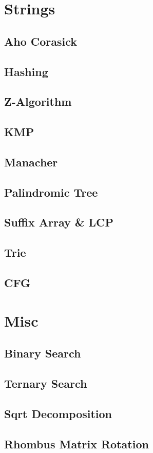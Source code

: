 	\section{Strings}
		\subsection{Aho Corasick}
			
		\subsection{Hashing}
			
		\subsection{Z-Algorithm}
			
		\subsection{KMP}
			
		\subsection{Manacher}
			
		\subsection{Palindromic Tree}
			
		\subsection{Suffix Array \& LCP}
			
		\subsection{Trie}
			
		\subsection{CFG}
			
	\section{Misc}
		\subsection{Binary Search}
			
		\subsection{Ternary Search}
			
		\subsection{Sqrt Decomposition}
			
		\subsection{Rhombus Matrix Rotation}
			
